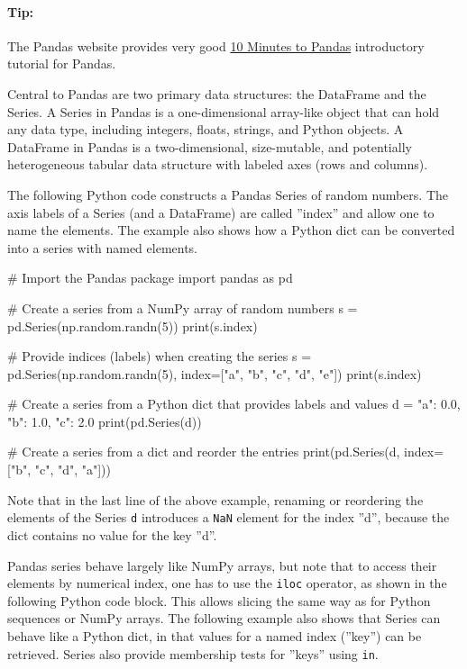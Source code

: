\begin{tcolorbox}[colback=code]
\paragraph*{Tip:}
The Pandas website provides very good \href{http://pandas.pydata.org/docs/user_guide/10min.html}{10 Minutes to Pandas} introductory tutorial for Pandas.
\end{tcolorbox}

Central to Pandas are two primary data structures: the DataFrame and the Series. A Series in Pandas is a one-dimensional array-like object that can hold any data type, including integers, floats, strings, and Python objects. A DataFrame in Pandas is a two-dimensional, size-mutable, and potentially heterogeneous tabular data structure with labeled axes (rows and columns).

The following Python code constructs a Pandas Series of random numbers. The axis labels of a Series (and a DataFrame) are called ''index'' and allow one to name the elements. The example also shows how a Python dict can be converted into a series with named elements.

\begin{samepage}
\begin{pythoncode}
# Import the Pandas package
import pandas as pd

# Create a series from a NumPy array of random numbers
s = pd.Series(np.random.randn(5))
print(s.index)

# Provide indices (labels) when creating the series
s = pd.Series(np.random.randn(5), index=["a", "b", "c", "d", "e"])
print(s.index)

# Create a series from a Python dict that provides labels and values
d = {"a": 0.0, "b": 1.0, "c": 2.0}
print(pd.Series(d))

# Create a series from a dict and reorder the entries
print(pd.Series(d, index=["b", "c", "d", "a"]))
\end{pythoncode}
\end{samepage}

Note that in the last line of the above example, renaming or reordering the elements of the Series \texttt{d} introduces a \texttt{NaN} element for the index ''d'', because the dict contains no value for the key ''d''.

Pandas series behave largely like NumPy arrays, but note that to access their elements by numerical index, one has to use the \texttt{iloc} operator, as shown in the following Python code block. This allows slicing the same way as for Python sequences or NumPy arrays. The following example also shows that Series can behave like a Python dict, in that values for a named index (''key'') can be retrieved. Series also provide membership tests for ''keys'' using \texttt{in}. 

